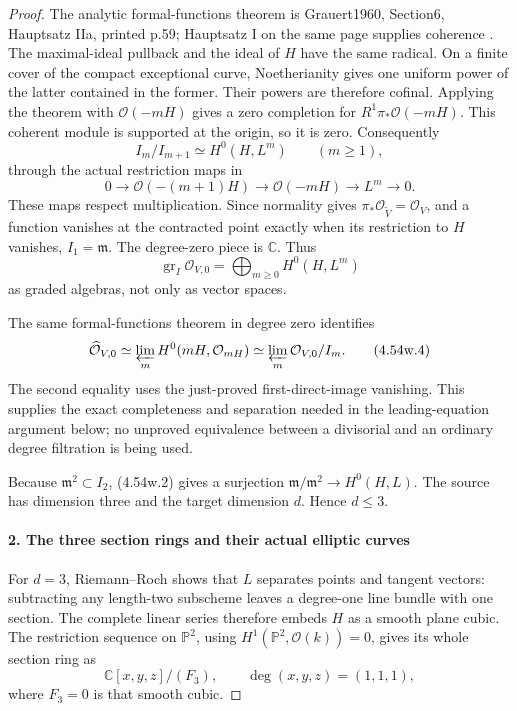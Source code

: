 \begin{proof}
The analytic formal-functions theorem is Grauert1960,
Section6, Hauptsatz IIa, printed p.59; Hauptsatz I on the same
page supplies coherence \cite[\S6, Hauptsätze I and IIa]{Grauert60}. The maximal-ideal pullback and the
ideal of \(H\) have the same radical. On a finite cover of
the compact exceptional curve, Noetherianity gives one uniform
power of the latter contained in the former. Their powers are
therefore cofinal. Applying the theorem with
\(\mathcal O(-mH)\) gives a zero completion for
\(R^1\pi_*\mathcal O(-mH)\). This coherent module is
supported at the origin, so it is zero. Consequently
\[
 I_m/I_{m+1}\simeq H^0(H,L^m)\qquad(m\ge1),             \tag{4.54w.2}
\]
through the actual restriction maps in
\[
 0\longrightarrow\mathcal O(-(m+1)H)
 \longrightarrow\mathcal O(-mH)
 \longrightarrow L^m\longrightarrow0.
\]
These maps respect multiplication. Since normality gives
\(\pi_*\mathcal O_{\widetilde V}=\mathcal O_V\), and a
function vanishes at the contracted point exactly when its
restriction to \(H\) vanishes, \(I_1=\mathfrak m\).
The degree-zero piece is \(\mathbb C\). Thus
\[
 \operatorname{gr}_{I}\mathcal O_{V,0}
   =\bigoplus_{m\ge0}H^0(H,L^m)                         \tag{4.54w.3}
\]
as graded algebras, not only as vector spaces.

The same formal-functions theorem in degree zero identifies
\[
 \widehat{\mathcal O}_{V,0}
      \simeq\varprojlim_m H^0(mH,\mathcal O_{mH})
      \simeq\varprojlim_m\mathcal O_{V,0}/I_m.          \tag{4.54w.4}
\]
The second equality uses the just-proved first-direct-image
vanishing. This supplies the exact completeness and separation
needed in the leading-equation argument below; no unproved equivalence between a
divisorial and an ordinary degree filtration is being used.

Because \(\mathfrak m^2\subset I_2\), (4.54w.2) gives a
surjection
\(\mathfrak m/\mathfrak m^2\to H^0(H,L)\).
The source has dimension three and the target dimension \(d\).
Hence \(d\le3\).

\paragraph{2. The three section rings and their actual elliptic curves}

For \(d=3\), Riemann--Roch shows that \(L\) separates
points and tangent vectors: subtracting any length-two
subscheme leaves a degree-one line bundle with one section.
The complete linear series therefore embeds \(H\) as a smooth
plane cubic. The restriction sequence on \(\mathbb P^2\),
using \(H^1(\mathbb P^2,\mathcal O(k))=0\), gives its whole
section ring as
\[
 \mathbb C[x,y,z]/(F_3),\qquad \deg(x,y,z)=(1,1,1),
\]
where \(F_3=0\) is that smooth cubic.


\end{proof}
